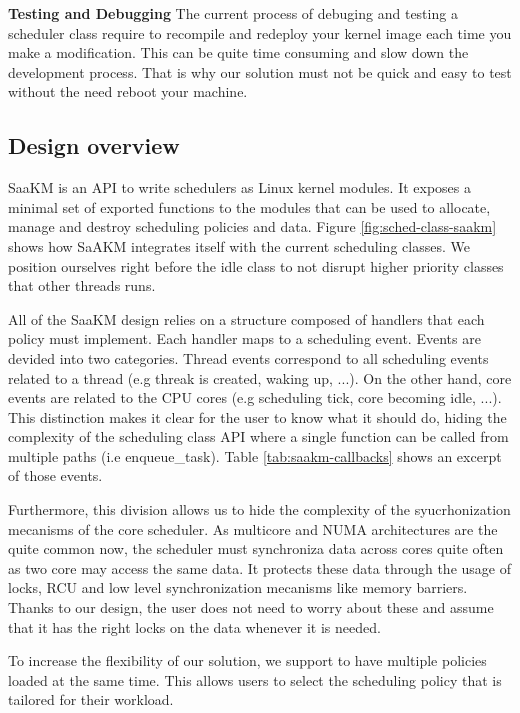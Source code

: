\textbf{Testing and Debugging} The current process of debuging and testing a scheduler class require to recompile and redeploy your kernel image each time you make a modification. This can be quite time consuming and slow down the development process. That is why our solution must not be quick and easy to test without the need reboot your machine.
\subsection{Design overview}
\par SaaKM is an API to write schedulers as Linux kernel modules. It exposes a minimal set of exported functions to the modules that can be used to allocate, manage and destroy scheduling policies and data. Figure \ref{fig:sched-class-saakm} shows how SaAKM integrates itself with the current scheduling classes. We position ourselves right before the idle class to not disrupt higher priority classes that other threads runs.\newline

\par All of the SaaKM design relies on a structure composed of handlers that each policy must implement. Each handler maps to a scheduling event. Events are devided into two categories. Thread events correspond to all scheduling events related to a thread (e.g threak is created, waking up, ...). On the other hand, core events are related to the CPU cores (e.g scheduling tick, core becoming idle, ...). This distinction makes it clear for the user to know what it should do, hiding the complexity of the scheduling class API where a single function can be called from multiple paths (i.e enqueue\_task). Table \ref{tab:saakm-callbacks} shows an excerpt of those events.\newline

\par Furthermore, this division allows us to hide the complexity of the syucrhonization mecanisms of the core scheduler. As multicore and NUMA architectures are the quite common now, the scheduler must synchroniza data across cores quite often as two core may access the same data. It protects these data through the usage of locks, RCU and low level synchronization mecanisms like memory barriers. Thanks to our design, the user does not need to worry about these and assume that it has the right locks on the data whenever it is needed. \newline

\par To increase the flexibility of our solution, we support to have multiple policies loaded at the same time. This allows users to select the scheduling policy that is tailored for their workload.

